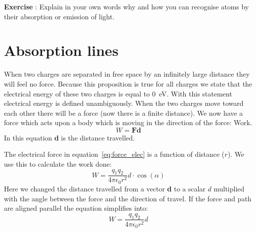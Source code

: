\documentclass[12pt,a4paper]{article}
\numberwithin{equation}{section}
\numberwithin{figure}{section}
\newcounter{Exercise}
\numberwithin{table}{section}
\begin{document}
\begin{shaded} \textbf{Exercise \theExercise {}} : Explain in your own words why and how you can recognise atoms by their absorption or emission of light. \end{shaded}

\section{Absorption lines}
When two charges are separated in free space by an infinitely large distance they will feel no force. Because this proposition is true for all charges we state that the electrical energy of these two charges is equal to 0~eV. With this statement electrical energy is defined unambiguously.
When the two charges move toward each other there will be a force (now there is a finite distance). We now have a force which acts upon a body which is moving in the direction of the force: Work.
\begin{equation}
W = \textbf{F} \textbf{d}  \label{eq:work}
\end{equation}
In this equation \textbf{d} is the distance travelled.

The electrical force in equation~\ref{eq:force_elec} is a function of distance ($r$). We use this to calculate the work done:
\begin{equation}
W = \frac{q_1 q_2}{4 \pi \epsilon_0 r^2} d \cdot \cos(\alpha) \label{eq:work_elec}
\end{equation}
Here we changed the distance travelled from a vector \textbf{d} to a scalar $d$ multiplied with the angle between the force and the direction of travel. If the force and path are aligned parallel the equation simplifies into:
\begin{equation}
W = \frac{q_1 q_2}{4 \pi \epsilon_0 r^2} d \label{eq:work_elec_2}
\end{equation}
\end{document}
